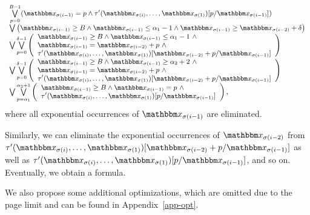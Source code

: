\[
\small
\begin{array}{l}
\bigvee \limits_{p=0}^{B-1} ( \ivarx_{\sigma(i-1)} = p \wedge \tau'(\ivarx_{\sigma(i)}, \ldots, \ivarx_{\sigma(1)}) [p/\ivarx_{\sigma(i-1)}])   \\
\bigvee \big(\ivarx_{\sigma(i-1)} \ge B \wedge \ivarx_{\sigma(i-1)} \le \alpha_1  - 1  \wedge \ivarx_{\sigma(i-1)} \ge \ivarx_{\sigma(i-2)} +\delta \big)\\
%
\bigvee \bigvee \limits_{p=0}^{\delta-1} 
\left(
\begin{array}{l}
\ivarx_{\sigma(i-1)} \ge B \wedge \ivarx_{\sigma(i-1)} \le \alpha_1  -1 \ \wedge \\
 \ivarx_{\sigma(i-1)} = \ivarx_{\sigma(i-2)} +p\ \wedge\\
 \tau'(\ivarx_{\sigma(i)}, \ldots, \ivarx_{\sigma(1)})[\ivarx_{\sigma(i-2)} + p /\ivarx_{\sigma(i-1)}] 
\end{array}
\right)\\
\bigvee \bigvee \limits_{p=0}^{\delta-1} 
\left(
\begin{array}{l}
\ivarx_{\sigma(i-1)} \ge B \wedge \ivarx_{\sigma(i-1)} \ge \alpha_2 + 2 \ \wedge \\
 \ivarx_{\sigma(i-1)} = \ivarx_{\sigma(i-2)} +p\ \wedge\\
 \tau'(\ivarx_{\sigma(i)}, \ldots, \ivarx_{\sigma(1)})[\ivarx_{\sigma(i-2)} + p /\ivarx_{\sigma(i-1)}] 
\end{array}
\right)\\
\bigvee \bigvee \limits_{p = \alpha_1}^{\alpha_2 + 1}
\left(
\begin{array}{l}
\ivarx_{\sigma(i-1)} \ge B \wedge \ivarx_{\sigma(i-1)} = p\ \wedge \\
 \tau'(\ivarx_{\sigma(i)}, \ldots, \ivarx_{\sigma(1)})[p /\ivarx_{\sigma(i-1)}] 
\end{array}
\right),
\end{array}
\]
where all exponential occurrences of $\ivarx_{\sigma(i-1)}$ are eliminated.

Similarly, we can eliminate the exponential occurrences of $\ivarx_{\sigma(i-2)}$ from $\tau'(\ivarx_{\sigma(i)}, \ldots, \ivarx_{\sigma(1)})[\ivarx_{\sigma(i-2)} + p /\ivarx_{\sigma(i-1)}]$ as well as  $\tau'(\ivarx_{\sigma(i)}, \ldots, \ivarx_{\sigma(1)})[p /\ivarx_{\sigma(i-1)}]$, and so on. Eventually, we obtain a {\pa} formula.

We also propose some additional optimizations, which are omitted due to the page limit and can be found in Appendix~\ref{app-opt}.



